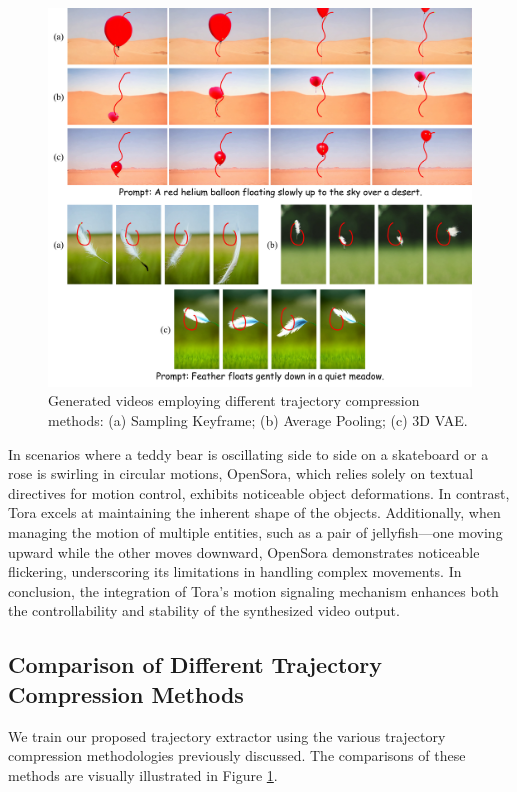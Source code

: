 \begin{figure}[!ht]
    \centering
    \includegraphics[width=\textwidth]{images/compare_compression.pdf}
    \caption{
        Generated videos employing different trajectory compression methods: (a) Sampling Keyframe; (b) Average Pooling; (c) 3D VAE.
    }
    \label{sup.f.compress}   
\end{figure}

In scenarios where a teddy bear is oscillating side to side on a skateboard or a rose is swirling in circular motions, OpenSora, which relies solely on textual directives for motion control, exhibits noticeable object deformations. In contrast, Tora excels at maintaining the inherent shape of the objects. Additionally, when managing the motion of multiple entities, such as a pair of jellyfish—one moving upward while the other moves downward, OpenSora demonstrates noticeable flickering, underscoring its limitations in handling complex movements. In conclusion, the integration of Tora's motion signaling mechanism enhances both the controllability and stability of the synthesized video output.

\subsection{Comparison of Different Trajectory Compression Methods}
We train our proposed trajectory extractor using the various trajectory compression methodologies previously discussed. The comparisons of these methods are visually illustrated in Figure \ref{sup.f.compress}.



